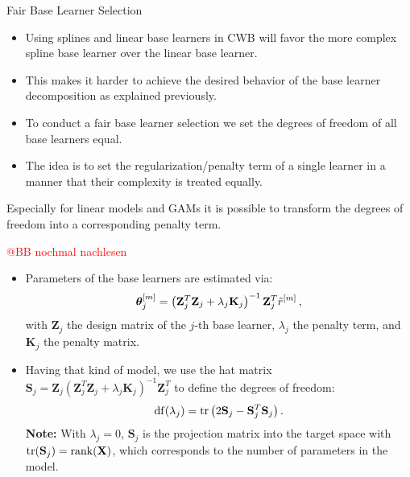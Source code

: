 \documentclass[11pt,compress,t,notes=noshow, xcolor=table]{beamer}
\begin{document}
\begin{vbframe}{Fair Base Learner Selection}

\begin{itemize}

  \item
    Using splines and linear base learners in CWB will favor
    the more complex spline base learner over the linear base learner.

  \item
    This makes it harder to achieve the desired behavior of the base learner
    decomposition as explained previously.

  \item
    To conduct a fair base learner selection we set the degrees of freedom of all base learners equal.

  \item
    The idea is to set the regularization/penalty term of a single learner in a manner that their complexity is treated equally.

\end{itemize}

\framebreak


Especially for linear models and GAMs it is possible to transform the degrees of freedom into a corresponding penalty term.

\textcolor{red}{@BB nochmal nachlesen}

\begin{itemize}

  \item
    Parameters of the base learners are estimated via:
    $$
    \bm{\theta}^{[m]}_j = \left(\mathbf{Z}_j^T \mathbf{Z}_j + \lambda_j \mathbf{K}_j
    \right)^{-1}\mathbf{Z}_j^T \tilde{r}^{[m]}\,,
    $$
    with $\mathbf{Z}_j$ the design matrix of the $j$-th base learner,
    $\lambda_j$ the penalty term, and $\mathbf{K}_j$ the penalty matrix.

  \item
    Having that kind of model, we use the hat matrix
    $\mathbf{S}_j = \mathbf{Z}_j\left(\mathbf{Z}_j^T \mathbf{Z}_j +
    \lambda_j \mathbf{K}_j\right)^{-1}\mathbf{Z}_j^T$ to define the degrees of
    freedom:
    $$
    \operatorname{df}(\lambda_j) = \operatorname{tr}\left(2\mathbf{S}_j - \mathbf{S}_j^T
    \mathbf{S}_j\right).
    $$
    \textbf{Note:} With $\lambda_j = 0$, $\mathbf{S}_j$ is the projection matrix
    into the target space with
    $\operatorname{tr}(\mathbf{S}_j) = \operatorname{rank}(\mathbf{X})$, which corresponds to
    the number of parameters in the model.


\end{itemize}
\end{vbframe}
\end{document}
